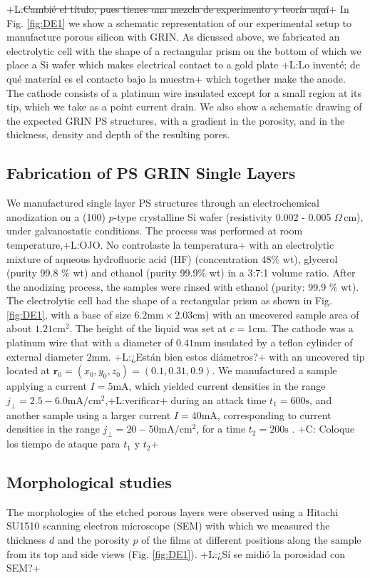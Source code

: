 \documentclass{article}
\newcommand{\notaL}[1]{{\color{blue}+L:#1+}}
\newcommand{\notaC}[1]{{\color{green}+C:#1+}}
\begin{document}
\notaL{\sout{Cambié el título, pues tienes una mezcla de experimento y
  teoría aquí}}
In Fig. \ref{fig:DE1} we show a schematic representation of our
experimental setup to manufacture porous silicon with GRIN.
As dicussed above, we fabricated an electrolytic cell with the shape of a
rectangular prism on the bottom of which we place a Si wafer which makes
electrical contact to a gold plate \notaL{Lo inventé; de qué material es
  el contacto bajo la muestra} which together make the anode. The
cathode consists of a platinum wire insulated except for a small region
at its tip, which we take as a point current drain.
We also show a schematic drawing of the expected GRIN PS structures,
with a gradient in the porosity, and in the thickness, density and depth
of the resulting pores.

\subsection{Fabrication of PS  GRIN Single Layers}
\label{sec:fabrication-ps-grin}
We manufactured single layer PS structures through an electrochemical
anodization on a (100) $p$-type crystalline Si wafer
(resistivity 0.002 - 0.005 $ \Omega\,\text{cm}$), under galvanostatic
conditions. The process was performed at
room temperature,\notaL{OJO. No controlaste la temperatura} with an
electrolytic mixture of aqueous hydrofluoric
acid (HF) (concentration 48\% wt), glycerol (purity 99.8 \% wt) and
ethanol (purity 99.9\% wt) in a 3:7:1 volume ratio. After the
anodizing process, the samples were rinsed with
ethanol (purity: 99.9 $ \% $  wt). The electrolytic cell had the shape
of a rectangular prism as shown in Fig. \ref{fig:DE1}, with a base of
size $6.2\text{mm}\times2.03\text{cm}$) with an uncovered sample area
of about $1.21\text{cm}^2$. The height of the liquid was set at
$c=1\text{cm}$. The cathode was a
platinum wire that with a diameter of $0.41\text{mm}$ insulated by a
teflon cylinder of external diameter $2\text{mm}$. \notaL{¿Están
  bien estos diámetros?} with an uncovered tip located at $\bm r_0=(x_0,
y_0,z_0)=(0.1,0.31,0.9)$.
We manufactured a sample applying a current $I=5\text{mA}$,
which yielded current densities in the range
$j_\perp=2.5-6.0\text{mA}/\text{cm}^2$,\notaL{verificar} during an attack time
$t_1=600 \text{s}$, and another sample using a larger
current $I=40\text{mA}$, corresponding to current densities in the
range $j_\perp=20-50\text{mA}/\text{cm}^2$, for a time $t_2=200 \text{s}$ . \notaC{
Coloque los tiempo de ataque para $t_1$ y $t_2$}
\subsection{Morphological studies}
\label{sec:morph-stud}
The morphologies of the etched porous layers were
observed using a Hitachi SU1510 scanning electron microscope (SEM)
with which we measured the thickness $d$ and the porosity $p$ of the
films at different positions along the sample from its top and side
views (Fig. \ref{fig:DE1}). \notaL{¿Sí se midió la porosidad con SEM?}
\end{document}
